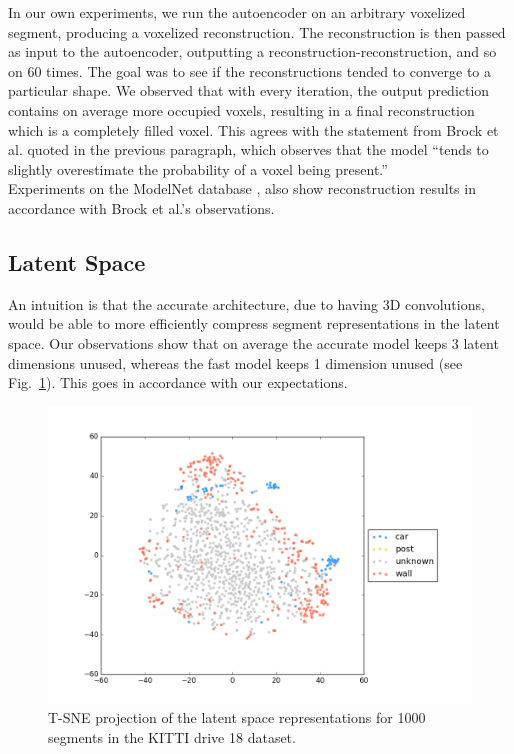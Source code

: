 In our own experiments, we run the autoencoder on an arbitrary voxelized segment, producing a voxelized reconstruction. The reconstruction is then passed as input to the autoencoder, outputting a reconstruction-reconstruction, and so on 60 times. The goal was to see if the reconstructions tended to converge to a particular shape. We observed that with every iteration, the output prediction contains on average more occupied voxels, resulting in a final reconstruction which is a completely filled voxel. This agrees with the statement from Brock et al. \cite{voxel-autoencoder} quoted in the previous paragraph, which observes that the model ``tends to slightly overestimate the probability of a voxel being present.''\\

Experiments on the ModelNet database \cite{modelnet}, also show reconstruction results in accordance with Brock et al.'s observations.


\subsection{Latent Space}

An intuition is that the accurate architecture, due to having 3D convolutions, would be able to more efficiently compress segment representations in the latent space. Our observations show that on average the accurate model keeps 3 latent dimensions unused, whereas the fast model keeps 1 dimension unused (see Fig.~\ref{fig:fastvaccurate-features}). This goes in accordance with our expectations.\\

\begin{figure}
  \centering
  \includegraphics[width=5.2in]{images/t-sne.png}
  \caption{T-SNE projection of the latent space representations for 1000 segments in the KITTI drive 18 dataset.}
  \label{fig:fastvaccurate-features}
\end{figure}

